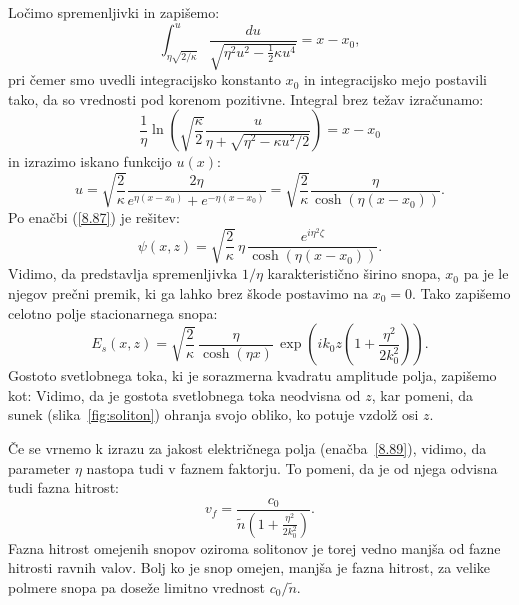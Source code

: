 Ločimo spremenljivki in zapišemo:
\begin{equation}
\int_{\eta\sqrt{2/\kappa}}^{u}\frac{du}{\sqrt{\eta^{2}u^2-\frac{1}{2}\kappa u^{4}}}=x-x_{0},
\label{8.85}
\end{equation}
pri čemer smo uvedli integracijsko konstanto $x_{0}$ in integracijsko mejo postavili 
tako, da so vrednosti pod korenom pozitivne.
Integral brez težav izračunamo:
\begin{equation}
\frac{1}{\eta}\ln\left(\sqrt{\frac{\kappa}{2}}\frac{u}{\eta+
\sqrt{\eta^{2}-\kappa u^{2}/2}}\right)=x-x_{0}
\end{equation}
in izrazimo iskano funkcijo $u(x)$:
\begin{equation}
u=\sqrt{\frac{2}{\kappa}}\frac{2 \eta }{e^{\eta(x-x_{0})}+e^{-\eta(x-x_{0})}}=
\sqrt{\frac{2}{\kappa}}\frac{\eta}{\cosh \left(\eta(x-x_{0})\right)}.
\label{8.86}
\end{equation}
Po enačbi (\ref{8.87}) je rešitev:
\begin{equation}
\psi(x,z)=\sqrt{\frac{2}{\kappa}}\,\eta\,\frac{e^{i\eta^{2}\zeta}}{\cosh \left(\eta(x-x_{0})\right)}.
\label{8.88}
\end{equation}
Vidimo, da predstavlja spremenljivka $1/\eta$  karakteristično širino snopa, $x_{0}$ pa
je le njegov prečni premik, ki ga lahko brez škode postavimo na $x_0=0$. Tako
zapišemo celotno polje stacionarnega snopa:
\begin{equation}
E_{s}(x,z)=\sqrt{\frac{2}{\kappa}}\,\frac{\eta}{\cosh(\eta x)}\,\exp\left(ik_{0}z\left(1+
\frac{\eta^{2}}{2k_{0}^{2}}\right)\right)\!\!.
\label{8.89}
\end{equation}
Gostoto svetlobnega toka, ki je sorazmerna 
kvadratu amplitude polja, zapišemo kot:
Vidimo, da je gostota svetlobnega toka neodvisna od $z$, kar pomeni, da sunek 
(slika~\ref{fig:soliton}) ohranja svojo obliko, ko potuje vzdolž osi $z$.

Če se vrnemo k izrazu za jakost električnega polja (enačba~\ref{8.89}), vidimo, da
parameter $\eta$ nastopa tudi v faznem faktorju. To pomeni, da je od njega odvisna 
tudi fazna hitrost:
\begin{equation}
v_{f}= \frac{c_0}{\tilde{n}\left(1+\frac{\eta^{2}}{2k_{0}^{2}}\right)}.
\end{equation}
Fazna hitrost omejenih snopov oziroma solitonov je torej
vedno manjša od fazne hitrosti ravnih valov. 
Bolj ko je snop omejen, manjša je fazna hitrost, za velike polmere snopa pa doseže 
limitno vrednost $c_0/\tilde{n}$.


